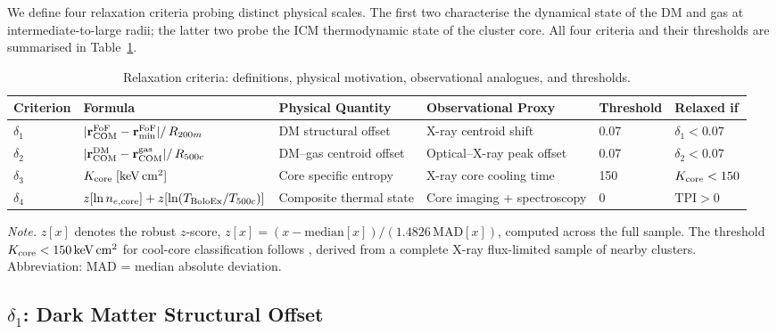 \documentclass[12pt]{article}
\newcommand{\Kcore}{K_{\rm core}}
\newcommand{\TPI}{\mathrm{TPI}}
\newcommand{\deltai}{\delta_1}
\newcommand{\deltaii}{\delta_2}
\newcommand{\deltaiii}{\delta_3}
\newcommand{\deltaiv}{\delta_4}
\newcommand{\kevcm}{{\rm keV\,cm^2}}
\begin{document}
We define four relaxation criteria probing distinct physical scales.
The first two characterise the dynamical state of the DM and gas at intermediate-to-large
radii; the latter two probe the ICM thermodynamic state of the cluster core.
All four criteria and their thresholds are summarised in Table~\ref{tab:criteria}.

\begin{table}[htbp]
\centering
\caption{Relaxation criteria: definitions, physical motivation, observational analogues, and thresholds.}
\label{tab:criteria}
\begin{tabular}{p{1.4cm} p{5.2cm} p{3.0cm} p{3.5cm} p{1.4cm} p{1.6cm}}
\toprule
Criterion & Formula & Physical Quantity & Observational Proxy & Threshold & Relaxed if \\
\midrule
$\deltai$
  & $|\mathbf{r}_{\rm COM}^{\rm FoF} - \mathbf{r}_{\rm min}^{\rm FoF}| /\, R_{200m}$
  & DM structural offset
  & X-ray centroid shift
  & 0.07
  & $\deltai < 0.07$ \\[6pt]
$\deltaii$
  & $|\mathbf{r}_{\rm COM}^{\rm DM} - \mathbf{r}_{\rm COM}^{\rm gas}| /\, R_{500c}$
  & DM--gas centroid offset
  & Optical--X-ray peak offset
  & 0.07
  & $\deltaii < 0.07$ \\[6pt]
$\deltaiii$
  & $\Kcore\;[\kevcm]$
  & Core specific entropy
  & X-ray core cooling time
  & 150
  & $\Kcore < 150$ \\[6pt]
$\deltaiv$
  & $z[\ln n_{e,\rm core}] + z[\ln(T_{\rm BoloEx}/T_{500c})]$
  & Composite thermal state
  & Core imaging + spectroscopy
  & 0
  & $\TPI > 0$ \\
\bottomrule
\end{tabular}
\par\smallskip
\raggedright\footnotesize
\emph{Note.} $z[x]$ denotes the robust $z$-score, $z[x]=(x-\mathrm{median}[x])/(1.4826\,\mathrm{MAD}[x])$,
computed across the full sample.
The threshold $\Kcore < 150\,\kevcm$ for cool-core classification follows \citet{hudson2010},
derived from a complete X-ray flux-limited sample of nearby clusters.
Abbreviation: MAD = median absolute deviation.
\end{table}

\subsection{\texorpdfstring{$\deltai$}{delta1}: Dark Matter Structural Offset}
\end{document}
